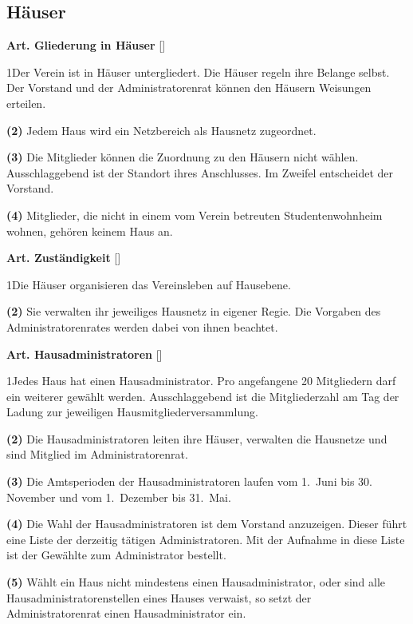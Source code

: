 \documentclass[12pt]{article}
\newcommand{\UAbschnitt}[1]{\subsection{#1}}
\newcommand{\Satz}[2]{

\begin{samepage}
{\bf (#1)} #2
\end{samepage}
}
\newenvironment{Artikel}[2]{
\bigskip \centerline{{\bf Art. #1} [#2]}
\nopagebreak
}{
}
\begin{document}
\UAbschnitt{Häuser} 

\begin{Artikel}{17}{Gliederung in Häuser}

\Satz{1}{Der Verein ist in Häuser untergliedert. Die Häuser regeln ihre Belange
selbst. Der Vorstand und der Administratorenrat können den Häusern Weisungen
erteilen.}

\Satz{2}{Jedem Haus wird ein Netzbereich als Hausnetz zugeordnet.}

\Satz{3}{Die Mitglieder können die Zuordnung zu den Häusern nicht wählen. 
Ausschlaggebend ist der Standort ihres Anschlusses. Im Zweifel entscheidet der
Vorstand.}

\Satz{4}{Mitglieder, die nicht in einem vom Verein betreuten Studentenwohnheim
wohnen, gehören keinem Haus an.}

\end{Artikel}

\begin{Artikel}{18}{Zuständigkeit}

\Satz{1}{Die Häuser organisieren das Vereinsleben auf Hausebene.}

\Satz{2}{Sie verwalten ihr jeweiliges Hausnetz in eigener Regie. Die Vorgaben
des Administratorenrates werden dabei von ihnen beachtet.}

\end{Artikel}

\begin{Artikel}{19}{Hausadministratoren}

\Satz{1}{Jedes Haus hat einen Hausadministrator. Pro angefangene 20 Mitgliedern
darf ein weiterer gewählt werden. Ausschlaggebend ist die Mitgliederzahl am
Tag der Ladung zur jeweiligen Hausmitgliederversammlung.}

\Satz{2}{Die Hausadministratoren leiten ihre Häuser, verwalten die Hausnetze
und sind Mitglied im Administratorenrat.}

\Satz{3}{Die Amtsperioden der Hausadministratoren laufen vom \mbox{1. Juni} bis
30. November und vom \mbox{1. Dezember} bis \mbox{31. Mai}.}

\Satz{4}{Die Wahl der Hausadministratoren ist dem Vorstand anzuzeigen.  Dieser
führt eine Liste der derzeitig tätigen Administratoren. Mit der Aufnahme in
diese Liste ist der Gewählte zum Administrator bestellt.}

\Satz{5}{Wählt ein Haus nicht mindestens einen Hausadministrator, oder sind
alle Hausadministratorenstellen eines Hauses verwaist, so setzt der
Administratorenrat einen Hausadministrator ein.}

\end{Artikel}
\end{document}
